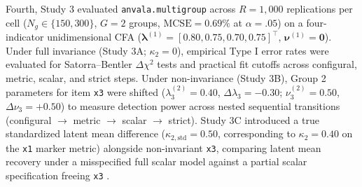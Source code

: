 ﻿\documentclass[12pt,letterpaper]{article}
\begin{document}
Fourth, Study 3 evaluated \texttt{anvala.multigroup} across $R = 1{,}000$ replications per cell ($N_g \in \{150, 300\}$, $G = 2$ groups, $\mathrm{MCSE} = 0.69\%$ at $\alpha = .05$) on a four-indicator unidimensional CFA ($\boldsymbol{\lambda}^{(1)} = [0.80, 0.75, 0.70, 0.75]^{\top}$, $\boldsymbol{\nu}^{(1)} = \mathbf{0}$). Under full invariance (Study 3A; $\kappa_2 = 0$), empirical Type I error rates were evaluated for Satorra--Bentler $\Delta\chi^2$ tests and practical fit cutoffs \parencite[$\Delta\mathrm{CFI} < -.010$, $\Delta\mathrm{RMSEA} > .015$;][]{chen2007} across configural, metric, scalar, and strict steps. Under non-invariance (Study 3B), Group 2 parameters for item \texttt{x3} were shifted ($\lambda^{(2)}_3 = 0.40$, $\Delta\lambda_3 = -0.30$; $\nu^{(2)}_3 = 0.50$, $\Delta\nu_3 = +0.50$) to measure detection power across nested sequential transitions (configural $\to$ metric $\to$ scalar $\to$ strict). Study 3C introduced a true standardized latent mean difference ($\kappa_{2,\mathrm{std}} = 0.50$, corresponding to $\kappa_2 = 0.40$ on the \texttt{x1} marker metric) alongside non-invariant \texttt{x3}, comparing latent mean recovery under a misspecified full scalar model against a partial scalar specification freeing \texttt{x3} \parencite[\texttt{group\_\allowbreak partial};][]{byrne1989}.
\end{document}

